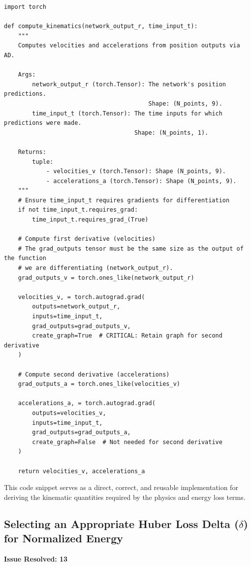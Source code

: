 \begin{lstlisting}
import torch

def compute_kinematics(network_output_r, time_input_t):
    """
    Computes velocities and accelerations from position outputs via AD.

    Args:
        network_output_r (torch.Tensor): The network's position predictions.
                                         Shape: (N_points, 9).
        time_input_t (torch.Tensor): The time inputs for which predictions were made.
                                     Shape: (N_points, 1).

    Returns:
        tuple:
            - velocities_v (torch.Tensor): Shape (N_points, 9).
            - accelerations_a (torch.Tensor): Shape (N_points, 9).
    """
    # Ensure time_input_t requires gradients for differentiation
    if not time_input_t.requires_grad:
        time_input_t.requires_grad_(True)

    # Compute first derivative (velocities)
    # The grad_outputs tensor must be the same size as the output of the function
    # we are differentiating (network_output_r).
    grad_outputs_v = torch.ones_like(network_output_r)

    velocities_v, = torch.autograd.grad(
        outputs=network_output_r,
        inputs=time_input_t,
        grad_outputs=grad_outputs_v,
        create_graph=True  # CRITICAL: Retain graph for second derivative
    )

    # Compute second derivative (accelerations)
    grad_outputs_a = torch.ones_like(velocities_v)

    accelerations_a, = torch.autograd.grad(
        outputs=velocities_v,
        inputs=time_input_t,
        grad_outputs=grad_outputs_a,
        create_graph=False  # Not needed for second derivative
    )

    return velocities_v, accelerations_a
\end{lstlisting}
This code snippet serves as a direct, correct, and reusable implementation for deriving the kinematic quantities required by the physics and energy loss terms.

\subsection{Selecting an Appropriate Huber Loss Delta (\texorpdfstring{$\delta$}{delta}) for Normalized Energy}
\textbf{Issue Resolved: 13}
